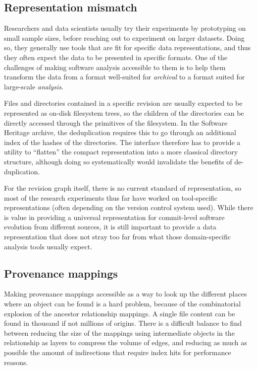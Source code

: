 \subsection{Representation mismatch}

Researchers and data scientists usually try their experiments by prototyping on
small sample sizes, before reaching out to experiment on larger datasets.
Doing so, they generally use tools that are fit for specific data
representations, and thus they often expect the data to be presented in
specific formats. One of the challenges of making software analysis accessible
to them is to help them transform the data from a format well-suited for
\emph{archival} to a format suited for large-scale \emph{analysis}.

Files and directories contained in a specific revision are usually expected to
be represented as on-disk filesystem trees, so the children of the
directories can be directly accessed through the primitives of the filesystem.
In the Software Heritage archive, the deduplication requires this to go
through an additional index of the hashes of the directories. The interface
therefore has to provide a utility to ``flatten'' the compact representation
into a more classical directory structure, although doing so systematically
would invalidate the benefits of de-duplication.

For the revision graph itself, there is no current standard of representation,
so most of the research experiments thus far have worked on tool-specific
representations (often depending on the version control system used). While
there is value in providing a universal representation for commit-level
software evolution from different sources, it is still important to provide a
data representation that does not stray too far from what those domain-specific
analysis tools usually expect.

\subsection{Provenance mappings}

Making provenance mappings accessible as a way to look up the different
places where an object can be found is a hard problem, because of the
combinatorial explosion of the ancestor relationship mappings.
A single file content can be found in thousand if not millions of origins.
There is a difficult balance to find between reducing the size of the
mappings using intermediate objects in the relationship as layers to compress
the volume of edges, and reducing as much as possible the amount of
indirections that require index hits for performance reasons.

